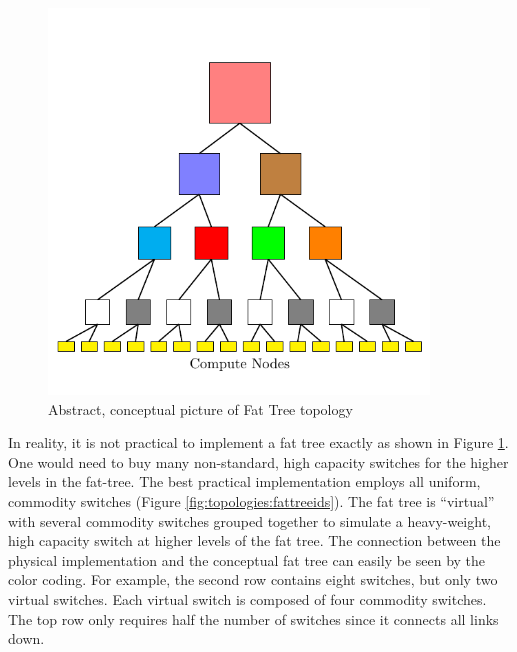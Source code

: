 \begin{figure}[h!]
\centering
\includegraphics[width=0.9\textwidth]{figures/tikz/fattree/abstract_fattree.pdf}
\caption{Abstract, conceptual picture of Fat Tree topology}
\label{fig:topologies:abstractfattree}
\end{figure}

In reality, it is not practical to implement a fat tree exactly as shown in Figure \ref{fig:topologies:abstractfattree}.
One would need to buy many non-standard, high capacity switches for the higher levels in the fat-tree.
The best practical implementation employs all uniform, commodity switches (Figure \ref{fig:topologies:fattreeids}).
The fat tree is ``virtual'' with several commodity switches grouped together to simulate a heavy-weight, high capacity switch
at higher levels of the fat tree.
The connection between the physical implementation and the conceptual fat tree can easily be seen by the color coding.
For example, the second row contains eight switches, but only two virtual switches.
Each virtual switch is composed of four commodity switches.
The top row only requires half the number of switches since it connects all links down.

